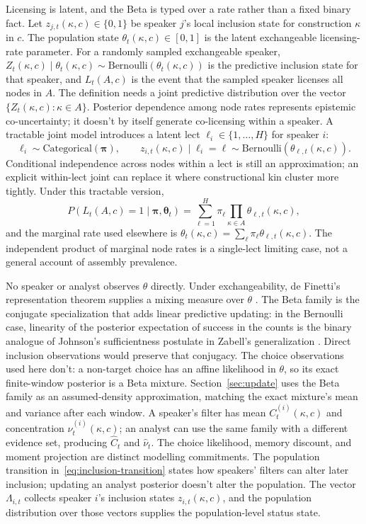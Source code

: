 Licensing is latent, and the Beta is typed over a rate rather than a fixed binary
fact. Let $z_{j,t}(\kappa,c)\in\{0,1\}$ be speaker $j$'s local inclusion state
for construction $\kappa$ in $c$. The population state
$\theta_t(\kappa,c)\in[0,1]$ is the latent exchangeable licensing-rate
parameter. For a randomly sampled exchangeable speaker,
$Z_t(\kappa,c)\mid\theta_t(\kappa,c)\sim
\mathrm{Bernoulli}(\theta_t(\kappa,c))$ is the predictive inclusion state for
that speaker, and $L_t(A,c)$ is the event that the sampled speaker licenses all
nodes in $A$. The definition needs a joint predictive distribution
over the vector $\{Z_t(\kappa,c):\kappa\in A\}$. Posterior dependence among
node rates represents epistemic co-uncertainty; it doesn't by itself generate
co-licensing within a speaker. A tractable joint model introduces a latent lect
$\ell_i\in\{1,\ldots,H\}$ for speaker $i$:
\[
\ell_i\sim\mathrm{Categorical}(\boldsymbol{\pi}),\qquad
z_{i,t}(\kappa,c)\mid\ell_i=\ell\sim
\mathrm{Bernoulli}\!\left(\theta_{\ell,t}(\kappa,c)\right).
\]
Conditional independence across nodes within a lect is still an approximation;
an explicit within-lect joint can replace it where constructional kin cluster
more tightly. Under this tractable version,
\[
P\!\left(L_t(A,c)=1\mid\boldsymbol{\pi},\boldsymbol{\theta}_t\right)=
\sum_{\ell=1}^{H}\pi_\ell\prod_{\kappa\in A}
\theta_{\ell,t}(\kappa,c),
\]
and the marginal rate used elsewhere is
$\theta_t(\kappa,c)=\sum_\ell\pi_\ell\theta_{\ell,t}(\kappa,c)$. The
independent product of marginal node rates is a single-lect limiting
case, not a general account of assembly prevalence.

No speaker or analyst observes $\theta$ directly. Under exchangeability, de Finetti's
representation theorem supplies a mixing measure over $\theta$
\citep{deFinetti1937}. The Beta family is the conjugate specialization
that adds linear predictive updating: in the Bernoulli case, linearity of the
posterior expectation of success in the counts is the binary analogue of
Johnson's sufficientness postulate in Zabell's generalization
\citep{zabell1982}. Direct inclusion observations would preserve that
conjugacy. The choice observations used here don't: a non-target choice has an
affine likelihood in $\theta$, so its exact finite-window posterior is a Beta
mixture. Section~\ref{sec:update} uses the Beta family as an
assumed-density approximation, matching the exact mixture's mean and variance
after each window. A speaker's filter has mean
$C^{(i)}_t(\kappa,c)$ and concentration $\nu^{(i)}_t(\kappa,c)$; an analyst can
use the same family with a different evidence set, producing
$\widehat C_t$ and $\widehat\nu_t$. The choice likelihood, memory discount, and
moment projection are distinct modelling commitments. The population
transition in~\eqref{eq:inclusion-transition} states how speakers' filters can
alter later inclusion; updating an analyst posterior doesn't alter the
population. The vector $\Lambda_{i,t}$ collects speaker $i$'s inclusion states
$z_{i,t}(\kappa,c)$, and the population distribution over those vectors supplies
the population-level status state.

